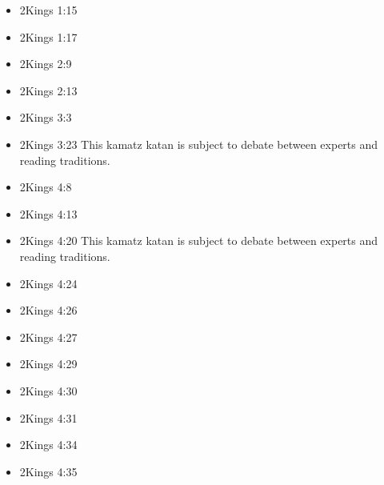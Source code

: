 \documentclass[14pt]{book}
\begin{document}
\begin{multicols}{2}
\begin{itemize}
											\item 2Kings 1:15
											
											\item 2Kings 1:17
											
											\item 2Kings 2:9
											
											\item 2Kings 2:13
											
											\item 2Kings 3:3
											
											\item 2Kings 3:23 This kamatz katan is subject to debate between experts and reading traditions.
													
													\item 2Kings 4:8
													
													\item 2Kings 4:13
													
													\item 2Kings 4:20 This kamatz katan is subject to debate between experts and reading traditions.
													
													\item 2Kings 4:24
													
													\item 2Kings 4:26
													
													\item 2Kings 4:27
													
													\item 2Kings 4:29
													
													\item 2Kings 4:30
													
													\item 2Kings 4:31
													
													\item 2Kings 4:34
													
													\item 2Kings 4:35
													

\end{itemize}
\end{multicols}
\end{document}
